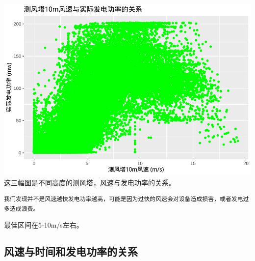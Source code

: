 \documentclass[
]{ctexart}
\begin{document}
\includegraphics{1_files/figure-latex/unnamed-chunk-6-3.pdf}
这三幅图是不同高度的测风塔，风速与发电功率的关系。

\begin{verbatim}
我们发现并不是风速越快发电功率越高，可能是因为过快的风速会对设备造成损害，或者发电过多造成浪费。
\end{verbatim}

最佳区间在5-10m/s左右。

\subsection{风速与时间和发电功率的关系}\label{ux98ceux901fux4e0eux65f6ux95f4ux548cux53d1ux7535ux529fux7387ux7684ux5173ux7cfb}
\end{document}
